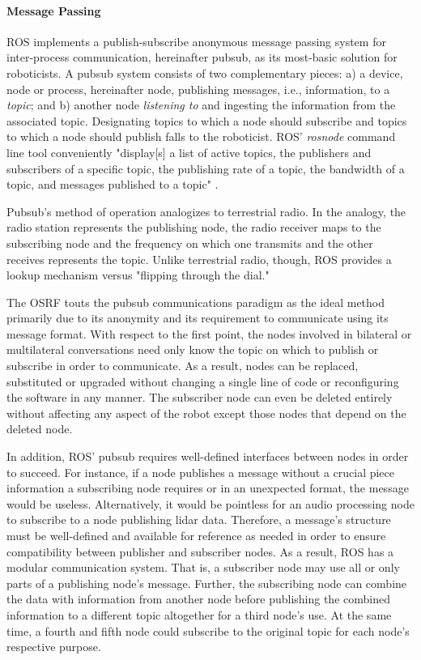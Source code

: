 \documentclass[9pt,twocolumn,twoside]{../../styles/osajnl}
\begin{document}
\paragraph{Message Passing}
ROS implements a publish-subscribe anonymous message passing system for inter-process communication, hereinafter pubsub, as its most-basic solution for roboticists.  A pubsub system consists of two complementary pieces: a) a device, node or process, hereinafter node, publishing messages, i.e., information, to a \textit{topic}; and b) another node \textit{listening to} and ingesting the information from the associated topic.  Designating topics to which a node should subscribe and topics to which a node should publish falls to the roboticist.  ROS' \textit{rosnode} command line tool conveniently "display[s] a list of active topics, the publishers and subscribers of a specific topic, the publishing rate of a topic, the bandwidth of a topic, and messages published to a topic" \cite{www-ros-rostopic}.

Pubsub's method of operation analogizes to terrestrial radio.  In the analogy, the radio station represents the publishing node, the radio receiver maps to the subscribing node and the frequency on which one transmits and the other receives represents the topic.  Unlike terrestrial radio, though, ROS provides a lookup mechanism versus "flipping through the dial."

The OSRF touts the pubsub communications paradigm as the ideal method  primarily due to its anonymity and its requirement to communicate using its message format.  With respect to the first point, the nodes involved in bilateral or multilateral conversations need only know the topic on which to publish or subscribe in order to communicate.  As a result, nodes can be replaced, substituted or upgraded without changing a single line of code or reconfiguring the software in any manner.  The subscriber node can even be deleted entirely without affecting any aspect of the robot except those nodes that depend on the deleted node.

In addition, ROS' pubsub requires well-defined interfaces between nodes in order to succeed.  For instance, if a node publishes a message without a crucial piece information a subscribing node requires or in an unexpected format, the message would be useless.  Alternatively, it would be pointless for an audio processing node to subscribe to a node publishing lidar data.  Therefore, a message's structure must be well-defined and available for reference as needed in order to ensure compatibility between publisher and subscriber nodes.  As a result, ROS has a modular communication system.  That is, a subscriber node may use all or only parts of a publishing node's message.  Further, the subscribing node can combine the data with information from another node before publishing the combined information to a different topic altogether for a third node's use.  At the same time, a fourth and fifth node could subscribe to the original topic for each node's respective purpose.  
\end{document}

